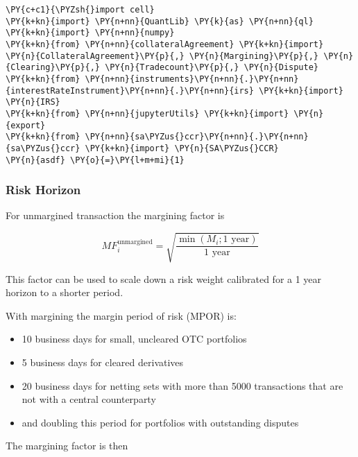     

    
    \begin{tcolorbox}[breakable, size=fbox, boxrule=1pt, pad at break*=1mm,colback=cellbackground, colframe=cellborder]
\begin{Verbatim}[commandchars=\\\{\}]
\PY{c+c1}{\PYZsh{}import cell}
\PY{k+kn}{import} \PY{n+nn}{QuantLib} \PY{k}{as} \PY{n+nn}{ql}
\PY{k+kn}{import} \PY{n+nn}{numpy}
\PY{k+kn}{from} \PY{n+nn}{collateralAgreement} \PY{k+kn}{import} \PY{n}{CollateralAgreement}\PY{p}{,} \PY{n}{Margining}\PY{p}{,} \PY{n}{Clearing}\PY{p}{,} \PY{n}{Tradecount}\PY{p}{,} \PY{n}{Dispute}
\PY{k+kn}{from} \PY{n+nn}{instruments}\PY{n+nn}{.}\PY{n+nn}{interestRateInstrument}\PY{n+nn}{.}\PY{n+nn}{irs} \PY{k+kn}{import} \PY{n}{IRS}
\PY{k+kn}{from} \PY{n+nn}{jupyterUtils} \PY{k+kn}{import} \PY{n}{export}
\PY{k+kn}{from} \PY{n+nn}{sa\PYZus{}ccr}\PY{n+nn}{.}\PY{n+nn}{sa\PYZus{}ccr} \PY{k+kn}{import} \PY{n}{SA\PYZus{}CCR}
\PY{n}{asdf} \PY{o}{=}\PY{l+m+mi}{1}
\end{Verbatim}
\end{tcolorbox}

    \hypertarget{risk-horizon}{%
\subsubsection{Risk Horizon}\label{risk-horizon}}

For unmargined transaction the margining factor is

\[MF^{\text{unmargined}}_i = \sqrt{\frac{\min\left(M_i;1\text{ year}\right)}{1\text{ year}}}\]

This factor can be used to scale down a risk weight calibrated for a 1
year horizon to a shorter period.

With margining the margin period of risk (MPOR) is:

\begin{itemize}
\tightlist
\item
  10 business days for small, uncleared OTC portfolios
\item
  5 business days for cleared derivatives
\item
  20 business days for netting sets with more than 5000 transactions
  that are not with a central counterparty
\item
  and doubling this period for portfolios with outstanding disputes
\end{itemize}

The margining factor is then

